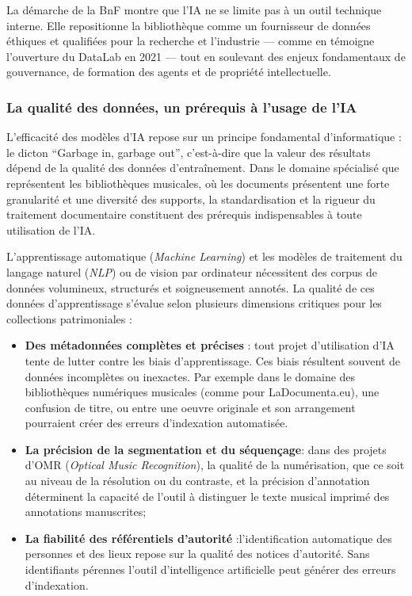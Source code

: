 La démarche de la BnF montre que l'IA ne se limite pas à un outil technique interne. Elle repositionne la bibliothèque comme un fournisseur de données éthiques et qualifiées pour la recherche et l'industrie — comme en témoigne l'ouverture du DataLab en 2021 — tout en soulevant des enjeux fondamentaux de gouvernance, de formation des agents et de propriété intellectuelle.


	\subsubsection*{La qualité des données, un prérequis à l'usage de l'IA}

L’efficacité des modèles d’IA repose sur un principe fondamental d’informatique : le dicton “Garbage in, garbage out”, c'est-à-dire que la valeur des résultats dépend de la qualité des données d’entraînement.
Dans le domaine spécialisé que représentent les bibliothèques musicales, où les documents présentent une forte granularité et une diversité des supports, la standardisation et la rigueur du traitement documentaire constituent des prérequis indispensables à toute utilisation de l’IA.


L'apprentissage automatique (\textit{Machine Learning}) et les modèles de traitement du langage naturel (\textit{NLP}) ou de vision par ordinateur nécessitent des corpus de données volumineux, structurés et soigneusement annotés. La qualité de ces données d'apprentissage s'évalue selon plusieurs dimensions critiques pour les collections patrimoniales :


\begin{itemize}
	
	\item \textbf{Des métadonnées complètes et précises} : tout projet d'utilisation d'IA tente de lutter contre les biais d'apprentissage. Ces biais résultent souvent de données incomplètes ou inexactes. Par exemple dans le domaine des bibliothèques numériques musicales (comme pour LaDocumenta.eu), une confusion de titre, ou entre une oeuvre originale et son arrangement pourraient créer des erreurs d'indexation automatisée.
	
	\item \textbf{La précision de la segmentation et du séquençage}: dans des projets d'OMR (\textit{Optical Music Recognition}), la qualité de la numérisation, que ce soit au niveau de la résolution ou du contraste, et la précision d'annotation déterminent la capacité de l'outil à distinguer le texte musical imprimé des annotations manuscrites;
	
	\item \textbf{La fiabilité des référentiels d'autorité }:l'identification automatique des personnes et des lieux repose sur la qualité des notices d'autorité. Sans identifiants pérennes l'outil d'intelligence artificielle peut générer des erreurs d'indexation. 
	
\end{itemize}

